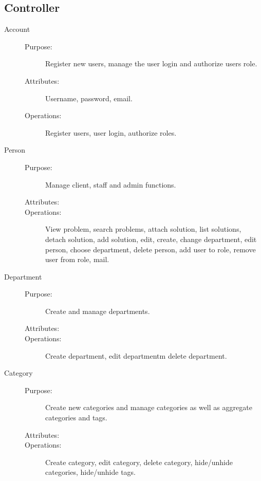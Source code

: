 \subsection{Controller}

\begin{description}
\item[Account]\hfill
\begin{description}
\item[Purpose:]Register new users, manage the user login and authorize users role.
\item[Attributes:] Username, password, email.
\item[Operations:]Register users, user login, authorize roles.
\end{description}
\end{description}

\begin{description}
\item[Person]\hfill
\begin{description}
\item[Purpose:]Manage client, staff and admin functions.
\item[Attributes:]
\item[Operations:]View problem, search problems, attach solution, list solutions, detach solution, add solution, edit, create, change department, edit person, choose department, delete person, add user to role, remove user from role, mail.
\end{description}
\end{description}

\begin{description}
\item[Department]\hfill
\begin{description}
\item[Purpose:]Create and manage departments.
\item[Attributes:]
\item[Operations:]Create department, edit departmentm delete department.
\end{description}
\end{description}

\begin{description}
\item[Category]\hfill
\begin{description}
\item[Purpose:]Create new categories and manage categories as well as aggregate categories and tags.
\item[Attributes:]
\item[Operations:]Create category, edit category, delete category, hide/unhide categories, hide/unhide tags.
\end{description}
\end{description}

